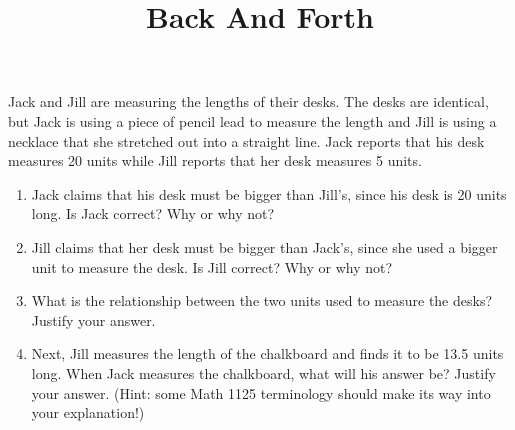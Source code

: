 \documentclass[nooutcomes,noauthor, handout]{ximera}
\title{Back And Forth}
\begin{document}
\begin{abstract}\end{abstract}
\maketitle




\begin{problem}
    Jack and Jill are measuring the lengths of their desks.  The desks are identical, but Jack is using a piece of pencil lead to measure the length and Jill is using a necklace that she stretched out into a straight line.  Jack reports that his desk measures 20 units while Jill reports that her desk measures 5 units.
    \begin{enumerate}
        \item Jack claims that his desk must be bigger than Jill's, since his desk is 20 units long.  Is Jack correct?  Why or why not?
        \item Jill claims that her desk must be bigger than Jack's, since she used a bigger unit to measure the desk.  Is Jill correct?  Why or why not?
        \item What is the relationship between the two units used to measure the desks?  Justify your answer.
        \item Next, Jill measures the length of the chalkboard and finds it to be 13.5 units long.  When Jack measures the chalkboard, what will his answer be?  Justify your answer.  (Hint: some Math 1125 terminology should make its way into your explanation!)
    \end{enumerate}
    

\end{problem} \vfill
\end{document}
